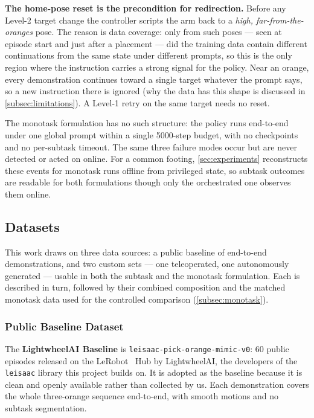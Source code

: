 \textbf{The home-pose reset is the precondition for redirection.} Before any Level-2 target change the controller scripts the arm back to a \emph{high, far-from-the-oranges} pose. The reason is data coverage: only from such poses --- seen at episode start and just after a placement --- did the training data contain different continuations from the same state under different prompts, so this is the only region where the instruction carries a strong signal for the policy. Near an orange, every demonstration continues toward a single target whatever the prompt says, so a new instruction there is ignored (why the data has this shape is discussed in \cref{subsec:limitations}). A Level-1 retry on the same target needs no reset.

The monotask formulation has no such structure: the policy runs end-to-end under one global prompt within a single 5000-step budget, with no checkpoints and no per-subtask timeout. The same three failure modes occur but are never detected or acted on online. For a common footing, \cref{sec:experiments} reconstructs these events for monotask runs offline from privileged state, so subtask outcomes are readable for both formulations though only the orchestrated one observes them online.

\subsection{Datasets}
\label{subsec:datasets}

This work draws on three data sources: a public baseline of end-to-end demonstrations, and two custom sets --- one teleoperated, one autonomously generated --- usable in both the subtask and the monotask formulation. Each is described in turn, followed by their combined composition and the matched monotask data used for the controlled comparison (\cref{subsec:monotask}).

\subsubsection{Public Baseline Dataset}
\label{subsec:baseline}

The \textbf{LightwheelAI Baseline} is \texttt{leisaac-pick-orange-mimic-v0}: 60 public episodes released on the LeRobot~\cite{lerobot2024} Hub by LightwheelAI, the developers of the \texttt{leisaac} library this project builds on. It is adopted as the baseline because it is clean and openly available rather than collected by us. Each demonstration covers the whole three-orange sequence end-to-end, with smooth motions and no subtask segmentation.

